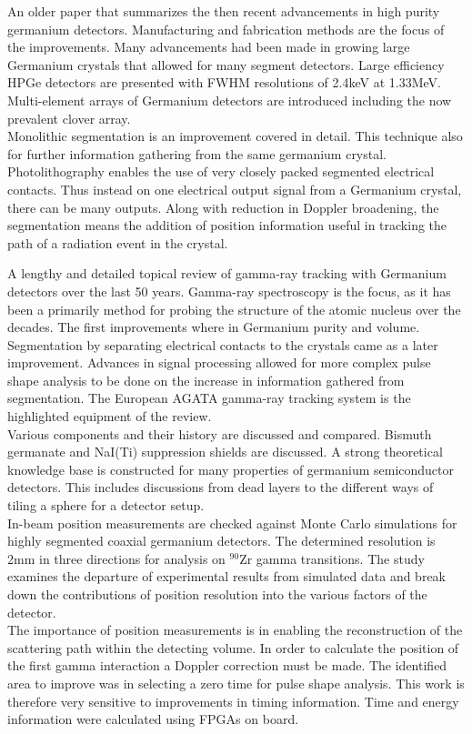 \documentclass[12pt]{article}
\begin{document}
\begin{doublespacing}
An older paper that summarizes the then recent advancements in high purity germanium detectors. Manufacturing and fabrication methods are the focus of the improvements. Many advancements had been made in growing large Germanium crystals that allowed for many segment detectors. Large efficiency HPGe detectors are presented with FWHM resolutions of 2.4keV at 1.33MeV. Multi-element arrays of Germanium detectors are introduced including the now prevalent clover array.
\\
Monolithic segmentation is an improvement covered in detail. This technique also for further information gathering from the same germanium crystal. Photolithography enables the use of very closely packed segmented electrical contacts. Thus instead on one electrical output signal from a Germanium crystal, there can be many outputs. Along with reduction in Doppler broadening, the segmentation means the addition of position information useful in tracking the path of a radiation event in the crystal.
\\[20pt]


{\large\textbf{\cite{Eberth2008283}}}

A lengthy and detailed topical review of gamma-ray tracking with Germanium detectors over the last 50 years. Gamma-ray spectroscopy is the focus, as it has been a primarily method for probing the structure of the atomic nucleus over the decades. The first improvements where in Germanium purity and volume. Segmentation by separating electrical contacts to the crystals came as a later improvement. Advances in signal processing allowed for more complex pulse shape analysis to be done on the increase in information gathered from segmentation. The European AGATA gamma-ray tracking system is the highlighted equipment of the review.
\\
Various components and their history are discussed and compared. Bismuth germanate and NaI(Ti) suppression shields are discussed. A strong theoretical knowledge base is constructed for many properties of germanium semiconductor detectors. This includes discussions from dead layers to the different ways of tiling a sphere for a detector setup.
\\[20pt]


{\large\textbf{\cite{Descovich2005535}}}
In-beam position measurements are checked against Monte Carlo simulations for highly segmented coaxial germanium detectors. The determined resolution is 2mm in three directions for analysis on $^{90}\mbox{Zr}$ gamma transitions. The study examines the departure of experimental results from simulated data and break down the contributions of position resolution into the various factors of the detector.
\\
The importance of position measurements is in enabling the reconstruction of the scattering path within the detecting volume. In order to calculate the position of the first gamma interaction a Doppler correction must be made. The identified area to improve was in selecting a zero time for pulse shape analysis. This work is therefore very sensitive to improvements in timing information. Time and energy information were calculated using FPGAs on board.
\\[20pt]



\end{doublespacing}
\end{document}
